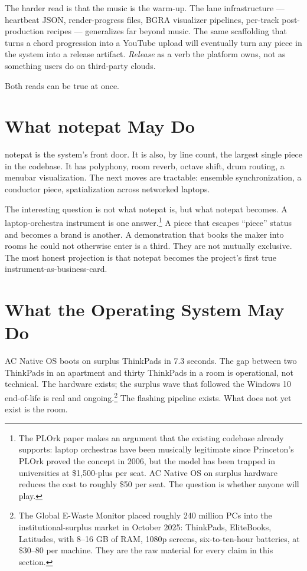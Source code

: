 \documentclass[11pt,letterpaper]{article}
\newcommand{\acos}{AC Native OS}
\newcommand{\np}{notepat}
\begin{document}
The harder read is that the music is the warm-up. The lane infrastructure --- heartbeat JSON, render-progress files, BGRA visualizer pipelines, per-track post-production recipes --- generalizes far beyond music. The same scaffolding that turns a chord progression into a YouTube upload will eventually turn any piece in the system into a release artifact. \textit{Release} as a verb the platform owns, not as something users do on third-party clouds.

Both reads can be true at once.

\section{What notepat May Do}

\np{} is the system's front door. It is also, by line count, the largest single piece in the codebase. It has polyphony, room reverb, octave shift, drum routing, a menubar visualization. The next moves are tractable: ensemble synchronization, a conductor piece, spatialization across networked laptops.

The interesting question is not what \np{} is, but what \np{} becomes. A laptop-orchestra instrument is one answer.\footnote{The PLOrk paper makes an argument that the existing codebase already supports: laptop orchestras have been musically legitimate since Princeton's PLOrk proved the concept in 2006, but the model has been trapped in universities at \$1,500-plus per seat. \acos{} on surplus hardware reduces the cost to roughly \$50 per seat. The question is whether anyone will play.} A piece that escapes ``piece'' status and becomes a brand is another. A demonstration that books the maker into rooms he could not otherwise enter is a third. They are not mutually exclusive. The most honest projection is that \np{} becomes the project's first true instrument-as-business-card.

\section{What the Operating System May Do}

\acos{} boots on surplus ThinkPads in 7.3 seconds. The gap between two ThinkPads in an apartment and thirty ThinkPads in a room is operational, not technical. The hardware exists; the surplus wave that followed the Windows 10 end-of-life is real and ongoing.\footnote{The Global E-Waste Monitor placed roughly 240 million PCs into the institutional-surplus market in October 2025: ThinkPads, EliteBooks, Latitudes, with 8--16 GB of RAM, 1080p screens, six-to-ten-hour batteries, at \$30--80 per machine. They are the raw material for every claim in this section.} The flashing pipeline exists. What does not yet exist is the room.
\end{document}
